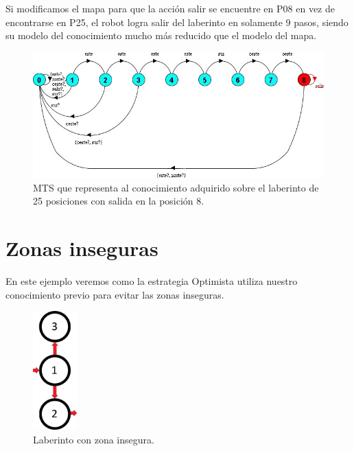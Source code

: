 \vspace{\baselineskip}
Si modificamos el mapa para que la acción salir se encuentre en \textcolor[HTML]{0000A0}{P08} en vez de encontrarse 
en \textcolor[HTML]{0000A0}{P25}, el robot logra salir del laberinto en solamente 9 pasos, siendo su modelo del conocimiento 
mucho más reducido que el modelo del mapa.

\begin{figure}[H]
	\centering
		\includegraphics[width=1.0\textwidth]{Imagenes/Laberintos/25_knowledge_alternativo.jpg}
	\caption{MTS que representa al conocimiento adquirido sobre el laberinto de 25 posiciones con salida en la posición 8.}
	\label{fig:25_knowledge_alternativo}
\end{figure}

\clearpage

\section{Zonas inseguras}

En este ejemplo veremos como la estrategia Optimista utiliza nuestro conocimiento previo para evitar las zonas inseguras.

\begin{figure}[H]
	\centering
		\includegraphics[width=0.15\textwidth]{Imagenes/Laberintos/unsafe.jpg}
	\caption{Laberinto con zona insegura.}
	\label{fig:unsafe}
\end{figure}

